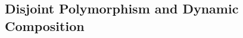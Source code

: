


\subsection{Disjoint Polymorphism and Dynamic Composition}
\label{sec:merge}

\begin{comment}
One important difference to traditional traits or classes is that traits in
\name are quite dynamic: we are able to compose traits \emph{dynamically} and
then instantiate them later. We have seen an example of dynamic inheritance in
\cref{sec:overview} to mimic mixins, where disjoint polymorphism plays an
important role. This is impossible in traditional OO languages, such as Scala,
since classes being inherited/instantiated must be known statically.

In Scala, given two concrete traits, it is possible to use \emph{mixin composition} to
create an object that implements both traits.
\begin{lstlisting}[language=scala]
trait A
trait B
val newAB : A with B = new A with B
\end{lstlisting}
Here the type \lstinline[language=scala]{A with B} is an intersection type,
and the expression \lstinline[language=scala]{new A with B} allows creating a new
object from the combination of the traits \lstinline{A} and
\lstinline{B}.
However, in Scala it is not possible to dynamically compose two
(statically unknown) \emph{objects}. For example, the following code: \jeremy{how is this useful to have?}
\begin{lstlisting}[language=scala]
// Invalid Scala code:
def merge[A,B] (x: A) (y: B) : A with B = new x with y
\end{lstlisting}
is rejected by the Scala compiler. The problem is that the
\lstinline[language=scala]{with} construct in Scala can only be used to mixin
(statically known) traits or classes, not arbitrary objects. This limitation essentially puts
intersection types in Scala in a second-class status.
\end{comment}

